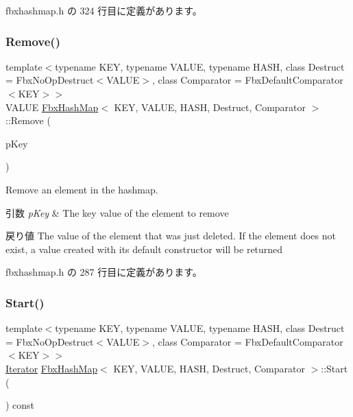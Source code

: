  fbxhashmap.\+h の 324 行目に定義があります。

\mbox{\label{class_fbx_hash_map_abe6d776a5b88b75b82d92e9c9dd5b513}} 
\subsubsection{\texorpdfstring{Remove()}{Remove()}}
{\footnotesize\ttfamily template$<$typename K\+EY, typename V\+A\+L\+UE, typename H\+A\+SH, class Destruct = Fbx\+No\+Op\+Destruct$<$\+V\+A\+L\+U\+E$>$, class Comparator = Fbx\+Default\+Comparator$<$\+K\+E\+Y$>$$>$ \\
V\+A\+L\+UE \hyperlink{class_fbx_hash_map}{Fbx\+Hash\+Map}$<$ K\+EY, V\+A\+L\+UE, H\+A\+SH, Destruct, Comparator $>$\+::Remove (\begin{DoxyParamCaption}\item[{const K\+EY \&}]{p\+Key }\end{DoxyParamCaption})\hspace{0.3cm}{\ttfamily [inline]}}

Remove an element in the hashmap. 
\begin{DoxyParams}{引数}
{\em p\+Key} & The key value of the element to remove \\
\hline
\end{DoxyParams}
\begin{DoxyReturn}{戻り値}
The value of the element that was just deleted. If the element does not exist, a value created with its default constructor will be returned 
\end{DoxyReturn}


 fbxhashmap.\+h の 287 行目に定義があります。

\mbox{\label{class_fbx_hash_map_a57577e8a4b29826e68f61e0d086f90d8}} 
\subsubsection{\texorpdfstring{Start()}{Start()}}
{\footnotesize\ttfamily template$<$typename K\+EY, typename V\+A\+L\+UE, typename H\+A\+SH, class Destruct = Fbx\+No\+Op\+Destruct$<$\+V\+A\+L\+U\+E$>$, class Comparator = Fbx\+Default\+Comparator$<$\+K\+E\+Y$>$$>$ \\
\hyperlink{class_fbx_hash_map_1_1_iterator}{Iterator} \hyperlink{class_fbx_hash_map}{Fbx\+Hash\+Map}$<$ K\+EY, V\+A\+L\+UE, H\+A\+SH, Destruct, Comparator $>$\+::Start (\begin{DoxyParamCaption}{ }\end{DoxyParamCaption}) const\hspace{0.3cm}{\ttfamily [inline]}}

